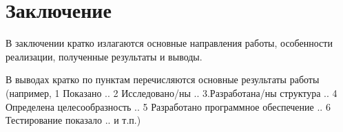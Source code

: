 \chapter*{Заключение}

В заключении кратко излагаются основные направления работы, особенности реализации, полученные результаты и выводы.

В выводах кратко по пунктам перечисляются основные результаты работы (например, 1 Показано .. 2 Исследовано/ны .. 3.Разработана/ны структура .. 4 Определена целесообразность .. 5 Разработано программное обеспечение .. 6 Тестирование показало .. и т.п.)